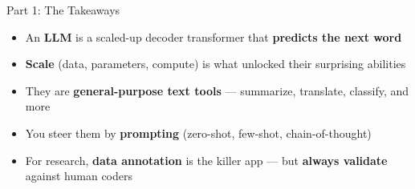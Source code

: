 \documentclass[aspectratio=169]{beamer}
\begin{document}
\begin{frame}{Part 1: The Takeaways}
\vspace{0.25cm}
\begin{itemize}\setlength\itemsep{7pt}
  \item[\textcolor{wurgreen}{\faCheck}]
    An \textbf{LLM} is a scaled-up decoder transformer that \textbf{predicts the next word}
  \item[\textcolor{wurgreen}{\faCheck}]
    \textbf{Scale} (data, parameters, compute) is what unlocked their surprising abilities
  \item[\textcolor{wurgreen}{\faCheck}]
    They are \textbf{general-purpose text tools} --- summarize, translate, classify, and more
  \item[\textcolor{wurgreen}{\faCheck}]
    You steer them by \textbf{prompting} (zero-shot, few-shot, chain-of-thought)
  \item[\textcolor{wurgreen}{\faCheck}]
    For research, \textbf{data annotation} is the killer app --- but \textbf{always validate}
    against human coders
\end{itemize}

\medskip
{}
\end{frame}
\end{document}
